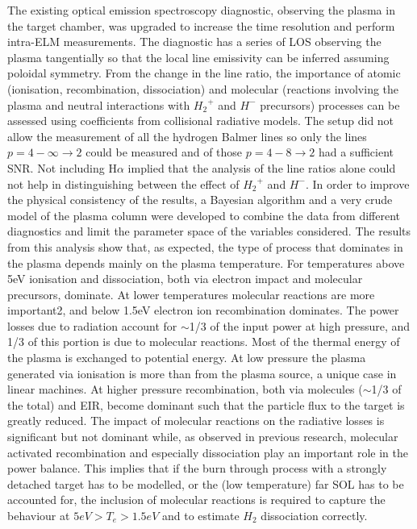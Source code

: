 The existing optical emission spectroscopy diagnostic, observing the plasma in the target chamber, was upgraded to increase the time resolution and perform intra-ELM measurements. The diagnostic has a series of LOS observing the plasma tangentially so that the local line emissivity can be inferred assuming poloidal symmetry. From the change in the line ratio, the importance of atomic (ionisation, recombination, dissociation) and molecular (reactions involving the plasma and neutral interactions with ${H_2}^+$ and $H^-$ precursors) processes can be assessed using coefficients from collisional radiative models. The setup did not allow the measurement of all the hydrogen Balmer lines so only the lines $p=4-\infty \rightarrow 2$ could be measured and of those $p=4-8 \rightarrow 2$ had a sufficient SNR. Not including H$\alpha$ implied that the analysis of the line ratios alone could not help in distinguishing between the effect of ${H_2}^+$ and $H^-$. In order to improve the physical consistency of the results, a Bayesian algorithm and a very crude model of the plasma column were developed to combine the data from different diagnostics and limit the parameter space of the variables considered. The results from this analysis show that, as expected, the type of process that dominates in the plasma depends mainly on the plasma temperature. For temperatures above 5eV ionisation and dissociation, both via electron impact and molecular precursors, dominate. At lower temperatures molecular reactions are more important2, and below 1.5eV electron ion recombination dominates. The power losses due to radiation account for $\sim$1/3 of the input power at high pressure, and 1/3 of this portion is due to molecular reactions. Most of the thermal energy of the plasma is exchanged to potential energy. At low pressure the plasma generated via ionisation is more than from the plasma source, a unique case in linear machines. At higher pressure recombination, both via molecules ($\sim$1/3 of the total) and EIR, become dominant such that the particle flux to the target is greatly reduced. The impact of molecular reactions on the radiative losses is significant but not dominant while, as observed in previous research, molecular activated recombination and especially dissociation play an important role in the power balance. This implies that if the burn through process with a strongly detached target has to be modelled, or the (low temperature) far SOL has to be accounted for, the inclusion of molecular reactions is required to capture the behaviour at $5eV>T_e>1.5eV$ and to estimate $H_2$ dissociation correctly.

